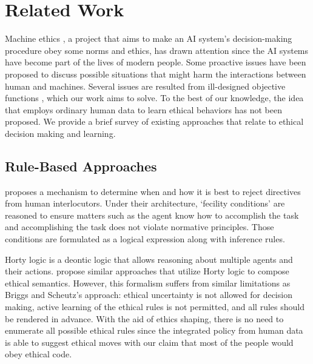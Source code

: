 \documentclass[letterpaper]{article} %
\begin{document}
\section{Related Work}
Machine ethics \cite{me}, a project that aims to make an AI system's decision-making procedure obey some norms and ethics, has drawn attention since the AI systems have become part of the lives of modern people. Some proactive issues \cite{wirehead,bostrom,super} have been proposed to discuss possible situations that might harm the interactions between human and machines. Several issues are resulted from ill-designed objective functions \cite{concrete}, which our work aims to solve. To the best of our knowledge, the idea that employs ordinary human data to learn ethical behaviors has not been proposed. We provide a brief survey of existing approaches that relate to ethical decision making and learning. 

\subsection{Rule-Based Approaches}
\cite{sorry} proposes a mechanism to determine when and how it is best to reject directives from human interlocutors. Under their architecture, `fecility conditions' are reasoned to ensure matters such as the agent know how to accomplish the task and accomplishing the task does not violate normative principles. Those conditions are formulated as a logical expression along with inference rules. 

Horty logic \cite{horty} is a deontic logic \cite{clarke} that allows reasoning about multiple agents and their actions. \cite{deontic1,deontic2} propose similar approaches that utilize Horty logic to compose ethical semantics. However, this formalism suffers from similar limitations as Briggs and Scheutz's approach: ethical uncertainty is not allowed for decision making, active learning of the ethical rules is not permitted, and all rules should be rendered in advance. With the aid of ethics shaping, there is no need to enumerate all possible ethical rules since the integrated policy from human data is able to suggest ethical moves with our claim that most of the people would obey ethical code.
\end{document}
